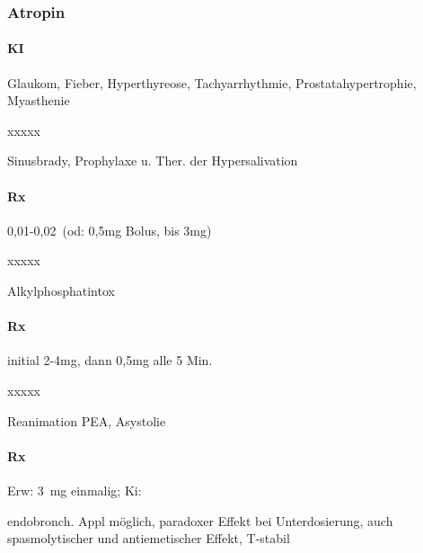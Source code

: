 \bigskip

\subsubsection{Atropin}


{\color[rgb]{0.8627451,0.13725491,0.0}
\paragraph{KI} Glaukom, Fieber, Hyperthyreose, Tachyarrhythmie,
Prostatahypertrophie, Myasthenie}

{\color[rgb]{0.0,0.5019608,0.0}
\begin{labeling}[~]{xxxxx}\item[I:] \item[KI]\end{labeling} Sinusbrady, Prophylaxe u. Ther. der Hypersalivation}

{\color[rgb]{0.5019608,0.0,0.5019608}
\paragraph{Rx} 0,01-0,02\, (od: 0,5mg Bolus, bis 3mg)}

{\color[rgb]{0.0,0.5019608,0.0}
\begin{labeling}[~]{xxxxx}\item[I:] \item[KI]\end{labeling} Alkylphosphatintox}

{\color[rgb]{0.5019608,0.0,0.5019608}
\paragraph{Rx} initial 2-4mg, dann 0,5mg alle 5 Min.}

{\color[rgb]{0.0,0.5019608,0.0}
\begin{labeling}[~]{xxxxx}\item[I:] \item[KI]\end{labeling} Reanimation PEA, Asystolie}

{\color[rgb]{0.5019608,0.0,0.5019608}
\paragraph{Rx} Erw: 3~mg einmalig; Ki: }

{
endobronch. Appl möglich, paradoxer Effekt bei Unterdosierung, auch
spasmolytischer und antiemetischer Effekt, T{\textdegree}-stabil}




